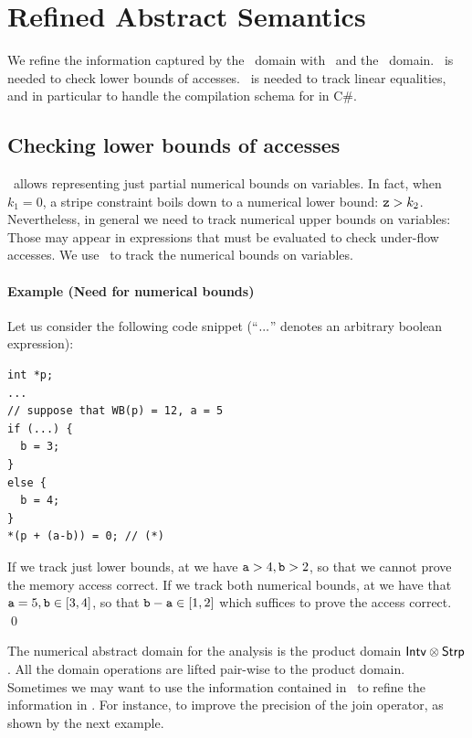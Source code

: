 \documentclass[10pt]{sigplanconf}
\begin{document}
\section{Refined Abstract Semantics}

We  refine the information captured by the \Stripes\ domain with \Intervals\ and the \Karr\ domain. 
\Intervals\ is needed to check lower bounds of accesses.
\Karr\ is needed to track linear equalities, and in particular to handle the compilation schema for  in C\#.

\subsection{Checking lower bounds of accesses}
\Stripes\ allows representing just partial numerical bounds on variables.
In fact, when $k_1 = 0$, a stripe constraint boils down to a numerical lower bound: $\mathtt{z} > k_2$.
Nevertheless, in general we need to track numerical upper bounds on variables: Those may appear in expressions that must be evaluated to check under-flow accesses.
We use \Intervals\ to track the numerical bounds on variables.

\paragraph{Example (Need for numerical bounds)}
Let us consider the following code snippet (``$\mathtt{...}$'' denotes an arbitrary boolean expression):
\begin{lstlisting}[frame=lines]
int *p;
...
// suppose that WB(p) = 12, a = 5
if (...) {
  b = 3;
}
else {
  b = 4;
}
*(p + (a-b)) = 0; // (*)
\end{lstlisting}
If we track just lower bounds, at \code{(*)} we have $\mathtt{a} > 4, \mathtt{b} > 2$, so that we cannot prove the memory access correct.
If we track both numerical bounds, at \code{(*)} we have that $\mathtt{a} = 5, \mathtt{b} \in [3,4]$, so that $\mathtt{b -a} \in [1,2]$ which suffices to prove the access correct. \qed


The numerical abstract domain for the analysis is the product domain
$\mathsf{Intv} \otimes \mathsf{Strp}$.  All the domain operations are lifted
pair-wise to the product domain.  Sometimes we may want to use the
information contained in \Intervals\ to refine the information in
\Stripes.  For instance, to improve the precision of the join
operator, as shown by the next example.
\end{document}
